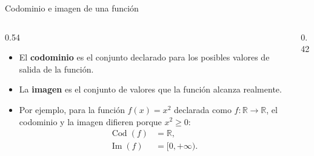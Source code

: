 \documentclass[main.tex]{subfiles}
\begin{document}
\begin{frame}{Codominio e imagen de una función}
  \begin{columns}[c,onlytextwidth]
    \begin{column}{0.54\textwidth}
      \begin{itemize}
        \item El \textbf{codominio} es el conjunto declarado para los
              posibles valores de salida de la función.

        \item La \textbf{imagen} es el conjunto de valores que la función
              alcanza realmente.

        \item Por ejemplo, para la función $f(x)=x^2$ declarada como
              $f:\mathbb{R}\longrightarrow\mathbb{R}$, el codominio
              y la imagen difieren porque $x^2\geq 0$:
              \[
                \begin{aligned}
                  \operatorname{Cod}(f)&=\mathbb{R},\\
                  \operatorname{Im}(f)&=[0,+\infty).
                \end{aligned}
              \]
      \end{itemize}
    \end{column}
    \begin{column}{0.42\textwidth}
      \centering
    \end{column}
  \end{columns}
\end{frame}
\end{document}
